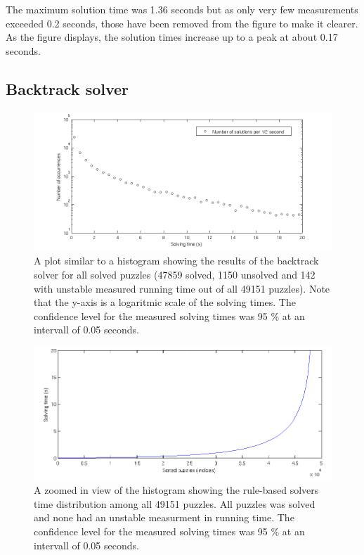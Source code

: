 \documentclass[a4paper,11pt]{kth-mag}
\begin{document}
The maximum solution time was 1.36 seconds but as only very few measurements exceeded 0.2 seconds, those have been removed from the figure to make it clearer.
As the figure displays, the solution times increase up to a peak at about 0.17 seconds.

\FloatBarrier
\subsection{Backtrack solver}

\begin{figure}[here] 
\centering
\includegraphics[width=16cm]{images/backtrack_distribution.png}
\caption{A plot similar to a histogram showing the results of the backtrack solver for all solved puzzles (47859 solved, 1150 unsolved and 142 with unstable measured running time out of all 49151 puzzles). Note that the y-axis is a logaritmic scale of the solving times. The confidence level for the measured solving times was 95 \% at an intervall of 0.05 seconds.}
\label{fig:backtrackDistribution}
\end{figure}

\begin{figure}[here] 
\centering
\includegraphics[width=16cm]{images/backtrack_sortedindices.png}
\caption{A zoomed in view of the histogram showing the rule-based solvers time distribution among all 49151 puzzles. All puzzles was solved and none had an unstable measurment in running time. The confidence level for the measured solving times was 95 \% at an intervall of 0.05 seconds.}
\label{fig:rule-basedDistribution}
\end{figure}
\end{document}
